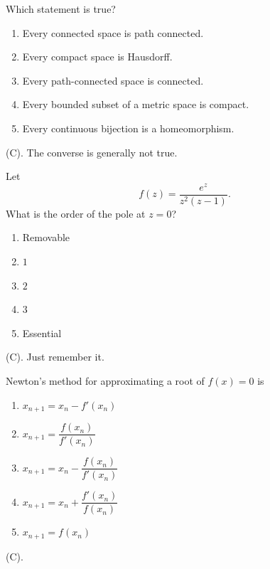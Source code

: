 \begin{exercise}
Which statement is true?

\begin{enumerate}[label=(\Alph*)]
    \item Every connected space is path connected.
    \item Every compact space is Hausdorff.
    \item Every path-connected space is connected.
    \item Every bounded subset of a metric space is compact.
    \item Every continuous bijection is a homeomorphism.
\end{enumerate}
\end{exercise}
\begin{solution}
(C). The converse is generally not true.
\end{solution}

\begin{exercise}
Let
\[
f(z)=\frac{e^z}{z^2(z-1)}.
\]
What is the order of the pole at $z=0$?
\begin{enumerate}[label=(\Alph*)]
    \item Removable
    \item $1$
    \item $2$
    \item $3$
    \item Essential
\end{enumerate}
\end{exercise}
\begin{solution}
(C). Just remember it.
\end{solution}

\begin{exercise}
Newton's method for approximating a root of $f(x)=0$ is
\begin{enumerate}[label=(\Alph*)]
    \item $x_{n+1}=x_n-f'(x_n)$
    \item $x_{n+1}=\dfrac{f(x_n)}{f'(x_n)}$
    \item $x_{n+1}=x_n-\dfrac{f(x_n)}{f'(x_n)}$
    \item $x_{n+1}=x_n+\dfrac{f'(x_n)}{f(x_n)}$
    \item $x_{n+1}=f(x_n)$
\end{enumerate}
\end{exercise}
\begin{solution}
(C).
\end{solution}

